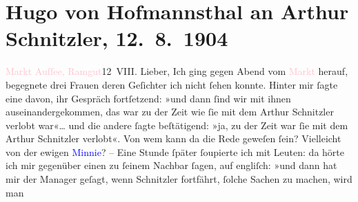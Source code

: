 

               \section[Hugo von Hofmannsthal an Arthur Schnitzler, 12. 8. 1904]{ Hugo von Hofmannsthal an Arthur Schnitzler, 12. 8. 1904}\nopagebreak{}\rehead{ }\normalsize\beginnumbering{} \toendnotes[C]{\smallbreak\pagebreak[2]} 
\toendnotes[C]{\smallbreak}\pstart
           \raggedleft{}{\pb}\textcolor{pink}{Markt Auſſee, Ramgut}{}\ledrightnote{\textcolor{pink}{Ramgut}}{\\}12 VIII.\pend
           \pstart{}Lieber,\pend\pstart
           Ich ging gegen Abend vom \textcolor{pink}{Markt}{}\ledrightnote{\textcolor{pink}{Bad Aussee}} herauf, begegnete
               drei Frauen deren Geſichter ich nicht ſehen konnte. Hinter mir ſagte eine davon, ihr
               Gespräch fortſetzend: »und dann ſind wir mit ihnen auseinandergekommen, das war zu
               der Zeit wie ſie mit dem Arthur Schnitzler verlobt war«{\dots}
               und die andere ſagte beſtätigend: »ja, zu der Zeit war ſie mit {\pb}dem Arthur Schnitzler verlobt«.
               Von wem kann da die Rede geweſen ſein? Vielleicht von der ewigen \textcolor{blue}{Minnie}{}\ledrightnote{\textcolor{blue}{Hermine von Schaffgotsch}}?\pend
           \pstart
           \numberlinefalse{}\centering{}–\numberlinetrue{}\pend
           \pstart
           \noindent{}Eine Stunde ſpäter ſoupierte ich mit Leuten: da hörte ich mir gegenüber einen  zu ſeinem Nachbar ſagen, auf engliſch: »und dann
               hat mir der Manager geſagt, wenn Schnitzler fortfährt, {\pb}ſolche Sachen zu machen, wird man
